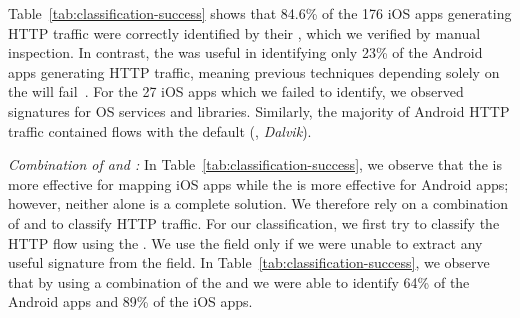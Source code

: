 Table~\ref{tab:classification-success} shows that 84.6\% of the 176 iOS apps generating HTTP traffic were correctly identified by their \useragent, which we verified by manual inspection.
In contrast, the \useragent was useful in identifying only 23\% of the Android apps generating HTTP traffic, meaning previous techniques depending solely on the \useragent will fail~\cite{maier:mobtraffic,xu:appusage}. 
For the 27 iOS apps which we failed to identify, we observed signatures for OS services and libraries.
Similarly, the majority of Android HTTP traffic contained flows with the default \useragent (\eg, \emph{Dalvik}).

\emph{Combination of \useragent and \httphost:} 
In Table~\ref{tab:classification-success}, we observe that the \useragent is more effective for mapping iOS apps while the \httphost is more effective for Android apps; however, neither alone is a complete solution. 
We therefore rely on a combination of \useragent and \httphost to classify HTTP traffic. 
For our classification, we first try to classify the HTTP flow using the \useragent.
We use the \httphost field only if we were unable to extract any useful signature from the \useragent field. 
In Table~\ref{tab:classification-success}, we observe that by using a combination of the \useragent and \httphost we were able to identify 64\% of the Android apps and 89\% of the iOS apps. 


